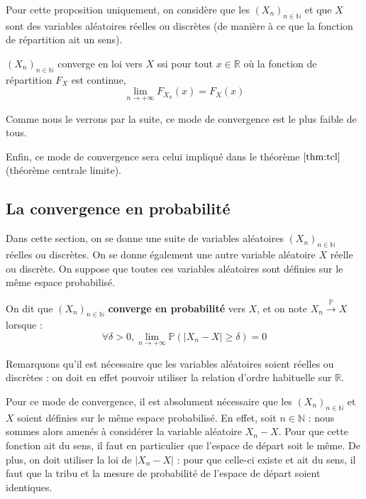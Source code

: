 \documentclass[../integ-proba.tex]{subfiles}
\begin{document}
Pour cette proposition uniquement, on considère que les $\left(X_n\right)_{n\in\mathbb{N}}$ et que $X$ sont des variables aléatoires réelles ou discrètes (de manière à ce que la fonction de répartition ait un sens).

\begin{prop}
    $\left(X_n\right)_{n\in\mathbb{N}}$ converge en loi vers $X$ ssi pour tout $x \in \mathbb{R}$ où la fonction de répartition $F_X$ est continue,
    $$
    \lim_{n \to +\infty} F_{X_n}(x) = F_X(x)
    $$
\end{prop}

\begin{rem}
    Comme nous le verrons par la suite, ce mode de convergence est le plus faible de tous.
\end{rem}

\begin{rem}
    Enfin, ce mode de convergence sera celui impliqué dans le théorème $\ref{thm:tcl}$ (théorème centrale limite).
\end{rem}

\subsection{La convergence en probabilité}

Dans cette section, on se donne une suite de variables aléatoires $\left(X_n\right)_{n\in\mathbb{N}}$ réelles ou discrètes.
On se donne également une autre variable aléatoire $X$ réelle ou discrète.
On suppose que toutes ces variables aléatoires sont définies sur le même espace probabilisé.

\begin{defi}
    On dit que $\left(X_n\right)_{n\in\mathbb{N}}$ \textbf{converge en probabilité} vers $X$, et on note $X_n \xrightarrow[]{\mathbb{P}} X$ lorsque :
    $$
    \forall \delta > 0, \lim_{n \to +\infty} \mathbb{P}\left(\left|X_n - X\right| \geq \delta\right) = 0
    $$
\end{defi}

\begin{rem}
    Remarquons qu'il est nécessaire que les variables aléatoires soient réelles ou discrètes : on doit en effet pouvoir utiliser la relation d'ordre habituelle sur $\mathbb{R}$.
\end{rem}

\begin{rem}
    Pour ce mode de convergence, il est absolument nécessaire que les $\left(X_n\right)_{n\in\mathbb{N}}$ et $X$ soient définies sur le même espace probabilisé.
    En effet, soit $n \in \mathbb{N}$ : nous sommes alors amenés à considérer la variable aléatoire $X_n - X$.
    Pour que cette fonction ait du sens, il faut en particulier que l'espace de départ soit le même.
    De plus, on doit utiliser la loi de $\left|X_n - X\right|$ : pour que celle-ci existe et ait du sens, il faut que la tribu et la mesure de probabilité de l'espace de départ soient identiques.
\end{rem}
\end{document}
